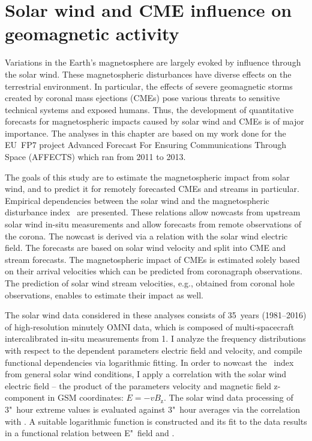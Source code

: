 
\chapter{Solar wind and CME influence on geomagnetic activity}
\label{chap:chapter2}

Variations in the Earth's magnetosphere are largely evoked by influence through the solar wind. These magnetospheric disturbances have diverse effects on the terrestrial environment. In particular, the effects of severe geomagnetic storms created by coronal mass ejections (CMEs) pose various threats to sensitive technical systems and exposed humans. Thus, the development of quantitative forecasts for magnetospheric impacts caused by solar wind and CMEs is of major importance.
The analyses in this chapter are based on my work done for the EU~FP7 project Advanced Forecast For Ensuring Communications Through Space (AFFECTS) which ran from 2011 to 2013.

The goals of this study are to estimate the magnetospheric impact from solar wind, and to predict it for remotely forecasted CMEs and streams in particular. Empirical dependencies between the solar wind and the magnetospheric disturbance index~\Kp{} are presented. These relations allow nowcasts from upstream solar wind in-situ measurements and allow forecasts from remote observations of the corona. The \Kp{} nowcast is derived via a relation with the solar wind electric field. The \Kp{} forecasts are based on solar wind velocity and split into CME and stream forecasts. The magnetospheric impact of CMEs is estimated solely based on their arrival velocities which can be predicted from coronagraph observations. The prediction of solar wind stream velocities, e.g., obtained from coronal hole observations, enables to estimate their impact as well.

The solar wind data considered in these analyses consists of 35~years (1981--2016) of high-resolution minutely OMNI data, which is composed of multi-spacecraft intercalibrated in-situ measurements from \SI{1}{\au}. I analyze the \Kp{} frequency distributions with respect to the dependent parameters electric field and velocity, and compile functional dependencies via logarithmic fitting.
In order to nowcast the \Kp~index from general solar wind conditions, I apply a correlation with the solar wind electric field -- the product of the parameters velocity and magnetic field z-component in GSM coordinates: $E = - v B_\text{z}$. The solar wind data processing of 3"~hour extreme values is evaluated against 3"~hour averages via the correlation with \Kp{}. A suitable logarithmic function is constructed and its fit to the data results in a functional relation between E"~field and \Kp{}.

